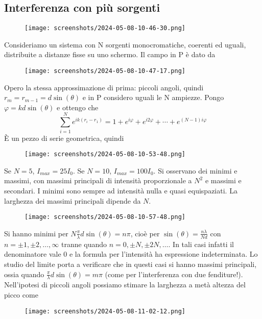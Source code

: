 \subsection{Interferenza con più sorgenti}
\begin{figure}[H]
	\centering
	\texttt{[image: screenshots/2024-05-08-10-46-30.png]}
\end{figure}
Consideriamo un sistema con N sorgenti monocromatiche, coerenti ed uguali, distribuite a distanze fisse su uno schermo. Il campo in P è dato da
\begin{figure}[H]
	\centering
	\texttt{[image: screenshots/2024-05-08-10-47-17.png]}
\end{figure}
Opero la stessa approssimazione di prima: piccoli angoli, quindi \(r_m = r_{m-1} = d \sin (\theta )\) e in P considero uguali le N ampiezze. Pongo \(\varphi = kd \sin (\theta )\) e ottengo che
\begin{equation}
	\sum_{i=1}^{N} e^{i k(r_i - r_1)} = 1 + e^{i \varphi } + e^{i 2 \varphi } + \cdots + e^{(N-1) i \varphi }
\end{equation}
È un pezzo di serie geometrica, quindi
\begin{figure}[H]
	\centering
	\texttt{[image: screenshots/2024-05-08-10-53-48.png]}
\end{figure}
Se \(N=5\), \(I_{max} = 25 I_0 \). Se \(N=10\), \(I_{max}=100 I_0 \). Si osservano dei minimi e massimi, con massimi principali di intensità proporzionale a \(N^{2} \) e massimi e secondari. I minimi sono sempre ad intensità nulla e quasi equispaziati. La larghezza dei massimi principali dipende da \(N\).
\begin{figure}[H]
	\centering
	\texttt{[image: screenshots/2024-05-08-10-57-48.png]}
\end{figure}
Si hanno minimi per \(N \frac{\pi}{\lambda } d \sin (\theta ) = n \pi\), cioè per \(\sin (\theta ) = \frac{n \lambda }{Nd}\) con \(n= \pm 1, \pm 2, \dots, \infty \) tranne quando \(n=0, \pm N, \pm 2N, \dots \). In tali casi infatti il denominatore vale 0 e la formula per l'intensità ha espressione indeterminata. Lo studio del limite porta a verificare che in questi casi si hanno massimi principali, ossia quando \(\frac{\pi}{\lambda } d \sin (\theta )= m \pi \) (come per l'interferenza con due fenditure!).
Nell'ipotesi di piccoli angoli possiamo stimare la larghezza a metà altezza del picco come
\begin{figure}[H]
	\centering
	\texttt{[image: screenshots/2024-05-08-11-02-12.png]}
\end{figure}